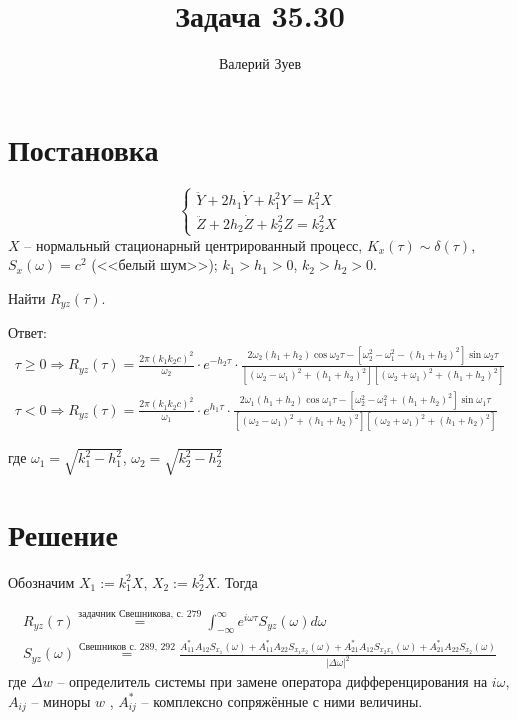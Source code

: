 \documentclass[a4paper,12pt]{article}
\begin{document}
\title{Задача 35.30}
\author{Валерий Зуев}
\maketitle

\section{Постановка}

\[\begin{cases}
    \ddot Y + 2 h_1 \dot Y + k_1^2 Y = k_1^2 X \\
    \ddot Z + 2 h_2 \dot Z + k_2^2 Z = k_2^2 X
\end{cases}\]
$X$ -- нормальный стационарный центрированный процесс, $K_x(\tau) \sim \delta(\tau)$, $S_x(\omega)=c^2$ (<<белый шум>>); $k_1 > h_1 > 0$, $k_2>h_2>0$.

Найти $R_{yz}(\tau)$.


\begin{leftbar}
    Ответ:
    \begin{gather*}
        \tau \ge 0 \Rightarrow R_{yz}(\tau) = \frac{2\pi (k_1 k_2 c)^2}{\omega_2} \cdot e^{-h_2 \tau} \cdot \frac{2 \omega_2 (h_1+h_2) \cos \omega_2 \tau - [\omega_2^2 - \omega_1^2 - (h_1+h_2)^2] \sin \omega_2 \tau}{[(\omega_2 - \omega_1)^2 + (h_1+h_2)^2][(\omega_2 + \omega_1)^2 + (h_1+h_2)^2]} \\
        \tau < 0 \Rightarrow R_{yz}(\tau) = \frac{2\pi (k_1 k_2 c)^2}{\omega_1} \cdot e^{h_1 \tau} \cdot \frac{2 \omega_1 (h_1+h_2) \cos \omega_1 \tau - [\omega_2^2 - \omega_1^2 + (h_1+h_2)^2] \sin \omega_1 \tau}{[(\omega_2 - \omega_1)^2 + (h_1+h_2)^2][(\omega_2 + \omega_1)^2 + (h_1+h_2)^2]}
    \end{gather*}

    где $ \omega_1 = \sqrt{k_1^2 - h_1^2} $, $ \omega_2 = \sqrt{k_2^2 - h_2^2} $
\end{leftbar}

\section{Решение}

Обозначим $ X_1 := k_1^2 X $, $ X_2 := k_2^2 X $.
Тогда

\begin{gather}
    R_{yz}(\tau) \overset{\text{задачник Свешникова, с. 279}}= \int_{-\infty}^\infty e^{i\omega \tau} S_{yz}(\omega) d \omega \label{eq:ryz} \\
    S_{yz}(\omega) \overset{\text{Свешников с. 289, 292}}= \frac{A_{11}^* A_{12} S_{x_1}(\omega) + A_{11}^* A_{22} S_{x_1 x_2}(\omega) + A_{21}^* A_{12} S_{x_2 x_1}(\omega) + A_{21}^* A_{22} S_{x_2}(\omega)}{|\Delta \omega|^2} \label{eq:syz}
\end{gather}
где $ \Delta w $ -- определитель системы при замене оператора дифференцирования на $i \omega$, $ A_{ij} $ -- миноры $w$ , $ A_{ij}^* $ -- комплексно сопряжённые с ними величины.
\end{document}
